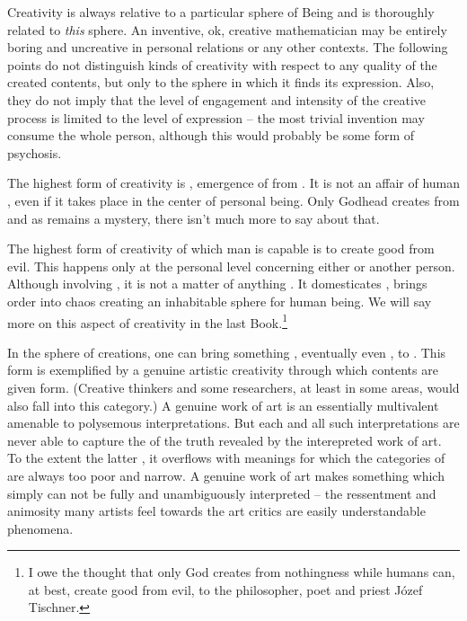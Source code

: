 Creativity is always relative to a particular 
sphere of Being and is thoroughly related to {\em this}
sphere. An inventive, ok, creative mathematician may be entirely 
boring and uncreative in personal relations or any other contexts. 
The following points do not distinguish kinds of creativity 
with respect to any quality of the created 
contents, but only to the sphere in which it finds its expression. 
Also, they do not imply that the level of engagement and intensity of 
the creative process is limited to the level of expression -- the most 
trivial invention may consume the whole person, although this would 
probably be some form of psychosis.

\pa
\inv The highest form of creativity is , emergence of 
 from . It is not an affair of human 
, even if it takes place in the center of personal 
being. Only Godhead 
creates from  and as  remains a mystery, 
there isn't much more to say about that.

\pa \mine The highest form of creativity of which man is capable is to
create good from evil.  This happens only at the personal level
concerning either  or another person.  Although involving
, it is not a matter of  anything
.  It domesticates , brings order into chaos
creating an inhabitable sphere for human being.  We will say more on
this aspect of creativity in the last Book.\footnote{I owe the thought
that only God creates from nothingness while humans can, at best,
create good from evil, to the philosopher, poet and priest J\'{o}zef
Tischner.}


\pa \act In the sphere of  creations, one can bring
something , eventually even , to
.  This form is exemplified by a genuine artistic
creativity through which  contents are given 
form.  (Creative thinkers and some researchers, at least in some
areas, would also fall into this category.)  A genuine work of art is
an essentially multivalent  amenable to polysemous
interpretations.  But each and all such interpretations are never able
to capture the  of the truth revealed by the interepreted
work of art.  To the extent the latter , it overflows
with meanings for which the  categories of 
are always too poor and narrow.  A genuine work of art makes 
something which simply can not be fully and unambiguously interpreted
-- the ressentment and animosity many artists feel towards the art
critics are easily understandable phenomena.


